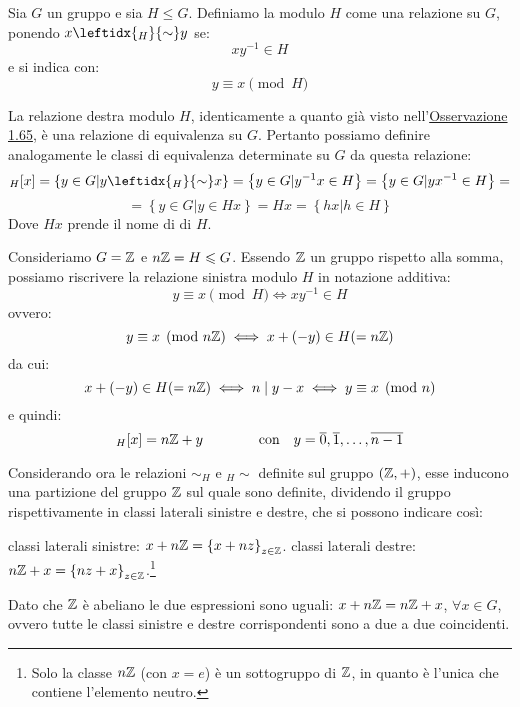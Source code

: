 \documentclass[11pt]{scrartcl}
\begin{document}
\begin{definition}
Sia $G$ un gruppo e sia $H \leqslant G$. Definiamo la  modulo $H$ come una relazione su $G$, ponendo $x \leftidx{_H}{\sim} y$ se:
	\[ xy^{-1} \in H\]
e si indica con:
	\[ y \equiv x \pmod{H}\]
\end{definition}

\begin{remark}
[${_H}\sim$]
La relazione destra modulo $H$, identicamente a quanto già visto nell'\hyperref[g:rm1]{Osservazione 1.65}, è una relazione di equivalenza su $G$. Pertanto possiamo definire analogamente le classi di equivalenza determinate su $G$ da questa relazione:
	\[ {_H}[x]
	=
	\left\{y \in G | y \leftidx{_H}{\sim} x\right\}
	=
	\left\{y \in G | y^{-1}x \in H\right\}
	=
	\left\{y \in G | yx^{-1} \in H\right\}
	= \] \[ =
	 \left\{y \in G | y \in Hx\right\}
	 =
	Hx
	 =
	 \left\{hx | h \in H\right\}
	\]
Dove $Hx$ prende il nome di  di $H$.
\end{remark}

\begin{example}
Consideriamo $G=\mathbb Z$ e $n\mathbb Z = H \leqslant G$. Essendo $\mathbb Z$ un gruppo rispetto alla somma, possiamo riscrivere la relazione sinistra modulo $H$ in notazione additiva:
	\[ y \equiv x \pmod{H}
	\iff
	xy^{-1} \in H
	\]
ovvero:
	\[ y \equiv x \pmod{n\mathbb Z}
	\iff
	x + (-y) \in H (=n\mathbb Z) 
	\]
da cui:
	\[ x + (-y) \in H (=n\mathbb Z)
	\iff
	n \mid y-x
	\iff
	y \equiv x \pmod{n}
	\]
e quindi:
	\[ {_H}[x]
	=
	n\mathbb Z + y
	\qquad
	\qquad
	\text{con}
	\quad
	y=\overline{0},\overline{1},\ldots,\overline{n-1}
	\]
\end{example}

\begin{remark}
Considerando ora le relazioni $\sim_H$ e ${_H}\sim$ definite sul gruppo $(\mathbb Z, +)$, esse inducono una partizione del gruppo $\mathbb Z$ sul quale sono definite, dividendo il gruppo rispettivamente in classi laterali sinistre e destre, che si possono indicare così:
	\begin{itemize}
	\ii classi laterali sinistre: $x + n\mathbb Z = \left\{x+nz\right\}_{z \in \mathbb Z}$.
	\ii classi laterali destre: $n\mathbb Z + x = \left\{nz +x\right\}_{z \in \mathbb Z}$.\footnote{Solo la classe $n\mathbb Z$ (con $x=e$) è un sottogruppo di $\mathbb Z$, in quanto è l'unica che contiene l'elemento neutro.}
	\end{itemize}
Dato che $\mathbb Z$ è abeliano le due espressioni sono uguali: $x + n\mathbb Z = n\mathbb Z + x$, $\forall x \in G$, ovvero tutte le classi sinistre e destre corrispondenti sono a due a due coincidenti.
\end{remark}
\end{document}
